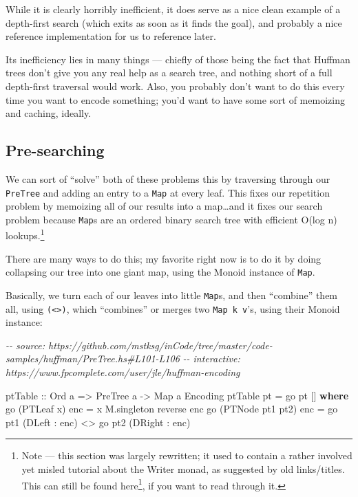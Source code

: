 \documentclass[]{article}
\newenvironment{Shaded}{}{}
\newcommand{\CommentTok}[1]{\textcolor[rgb]{0.38,0.63,0.69}{\textit{#1}}}
\newcommand{\DataTypeTok}[1]{\textcolor[rgb]{0.56,0.13,0.00}{#1}}
\newcommand{\FunctionTok}[1]{\textcolor[rgb]{0.02,0.16,0.49}{#1}}
\newcommand{\KeywordTok}[1]{\textcolor[rgb]{0.00,0.44,0.13}{\textbf{#1}}}
\newcommand{\NormalTok}[1]{#1}
\newcommand{\OperatorTok}[1]{\textcolor[rgb]{0.40,0.40,0.40}{#1}}
\newcommand{\OtherTok}[1]{\textcolor[rgb]{0.00,0.44,0.13}{#1}}
\renewcommand{\href}[2]{#2\footnote{\url{#1}}}
\begin{document}
While it is clearly horribly inefficient, it does serve as a nice clean example
of a depth-first search (which exits as soon as it finds the goal), and probably
a nice reference implementation for us to reference later.

Its inefficiency lies in many things --- chiefly of those being the fact that
Huffman trees don't give you any real help as a search tree, and nothing short
of a full depth-first traversal would work. Also, you probably don't want to do
this every time you want to encode something; you'd want to have some sort of
memoizing and caching, ideally.

\subsection{Pre-searching}\label{pre-searching}

We can sort of ``solve'' both of these problems this by traversing through our
\texttt{PreTree} and adding an entry to a \texttt{Map} at every leaf. This fixes
our repetition problem by memoizing all of our results into a map\ldots and it
fixes our search problem because \texttt{Map}s are an ordered binary search tree
with efficient O(log n) lookups.\footnote{Note --- this section was largely
  rewritten; it used to contain a rather involved yet misled tutorial about the
  Writer monad, as suggested by old links/titles. This can
  \href{https://github.com/mstksg/inCode/blob/master/copy/entries/.huffman-2-writer.md}{still
  be found here}, if you want to read through it.}

There are many ways to do this; my favorite right now is to do it by doing
collapsing our tree into one giant map, using the Monoid instance of
\texttt{Map}.

Basically, we turn each of our leaves into little \texttt{Map}s, and then
``combine'' them all, using \texttt{(\textless{}\textgreater{})}, which
``combines'' or merges two \texttt{Map\ k\ v}'s, using their Monoid instance:

\begin{Shaded}
\begin{Highlighting}[]
\CommentTok{{-}{-} source: https://github.com/mstksg/inCode/tree/master/code{-}samples/huffman/PreTree.hs\#L101{-}L106}
\CommentTok{{-}{-} interactive: https://www.fpcomplete.com/user/jle/huffman{-}encoding}

\OtherTok{ptTable ::} \DataTypeTok{Ord}\NormalTok{ a }\OtherTok{=\textgreater{}} \DataTypeTok{PreTree}\NormalTok{ a }\OtherTok{{-}\textgreater{}} \DataTypeTok{Map}\NormalTok{ a }\DataTypeTok{Encoding}
\NormalTok{ptTable pt }\OtherTok{=}\NormalTok{ go pt []}
  \KeywordTok{where}
\NormalTok{    go (}\DataTypeTok{PTLeaf}\NormalTok{ x) enc       }\OtherTok{=}\NormalTok{ x }\OtherTok{\textasciigrave{}M.singleton\textasciigrave{}} \FunctionTok{reverse}\NormalTok{ enc}
\NormalTok{    go (}\DataTypeTok{PTNode}\NormalTok{ pt1 pt2) enc }\OtherTok{=}\NormalTok{ go pt1 (}\DataTypeTok{DLeft}  \OperatorTok{:}\NormalTok{ enc) }\OperatorTok{\textless{}\textgreater{}}
\NormalTok{                              go pt2 (}\DataTypeTok{DRight} \OperatorTok{:}\NormalTok{ enc)}
\end{Highlighting}
\end{Shaded}
\end{document}
